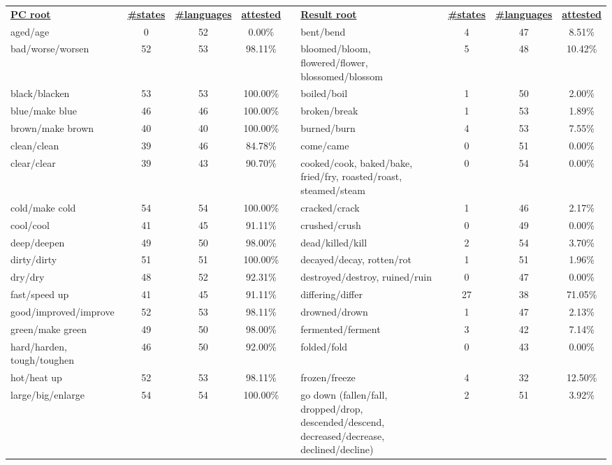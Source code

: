 \begin{tabular}{p{3cm}ccccp{3cm}ccc}
\underline{\textbf{PC root}} & \underline{\textbf{\#states}} & \underline{\textbf{\#languages}} & \underline{\textbf{attested}} & & \underline{\textbf{Result root}} & \underline{\textbf{\#states}} & \underline{\textbf{\#languages}} & \underline{\textbf{attested}} \\
aged/age & 0 & 52 & 0.00\% & & bent/bend & 4 & 47 & 8.51\% \\
bad/worse/worsen & 52 & 53 & 98.11\% & & bloomed/bloom, flowered/flower, blossomed/blossom & 5 & 48 & 10.42\% \\
black/blacken & 53 & 53 & 100.00\% & & boiled/boil & 1 & 50 & 2.00\% \\
blue/make blue & 46 & 46 & 100.00\% & & broken/break & 1 & 53 & 1.89\% \\
brown/make brown & 40 & 40 & 100.00\% & & burned/burn & 4 & 53 & 7.55\% \\
clean/clean & 39 & 46 & 84.78\% & & come/came & 0 & 51 & 0.00\% \\
clear/clear & 39 & 43 & 90.70\% & & cooked/cook, baked/bake, fried/fry, roasted/roast, steamed/steam & 0 & 54 & 0.00\% \\
cold/make cold & 54 & 54 & 100.00\% & & cracked/crack & 1 & 46 & 2.17\% \\
cool/cool & 41 & 45 & 91.11\% & & crushed/crush & 0 & 49 & 0.00\% \\
deep/deepen & 49 & 50 & 98.00\% & & dead/killed/kill & 2 & 54 & 3.70\% \\
dirty/dirty & 51 & 51 & 100.00\% & & decayed/decay, rotten/rot & 1 & 51 & 1.96\% \\
dry/dry & 48 & 52 & 92.31\% & & destroyed/destroy, ruined/ruin & 0 & 47 & 0.00\% \\
fast/speed up & 41 & 45 & 91.11\% & & differing/differ & 27 & 38 & 71.05\% \\
good/improved/improve & 52 & 53 & 98.11\% & & drowned/drown & 1 & 47 & 2.13\% \\
green/make green & 49 & 50 & 98.00\% & & fermented/ferment & 3 & 42 & 7.14\% \\
hard/harden, tough/toughen & 46 & 50 & 92.00\% & & folded/fold & 0 & 43 & 0.00\% \\
hot/heat up & 52 & 53 & 98.11\% & & frozen/freeze & 4 & 32 & 12.50\% \\
large/big/enlarge & 54 & 54 & 100.00\% & & go down (fallen/fall, dropped/drop, descended/descend, decreased/decrease, declined/decline) & 2 & 51 & 3.92\% \\

\end{tabular}
